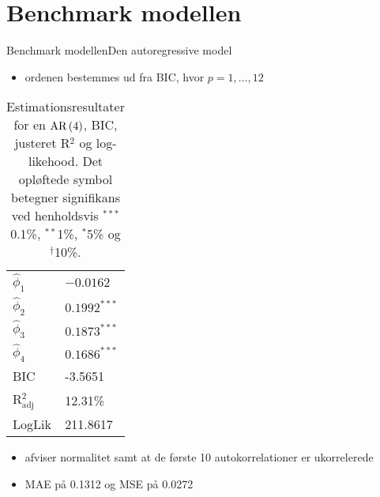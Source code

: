 \section{Benchmark modellen}
\begin{frame}{Benchmark modellen}{Den autoregressive model}
\begin{itemize}
\item ordenen bestemmes ud fra BIC, hvor \(p = 1,\ldots, 12\)
\end{itemize}
\begin{table}[h]
\center
\begin{tabular}{ll}
\toprule
$\widehat{\phi}_1$ &$ -0.0162 $ \\
$\widehat{\phi}_2$ & $0.1992^{***}$  \\
$\widehat{\phi}_3$ &$0.1873^{***}$  \\
$\widehat{\phi}_4$ &$0.1686^{***} $ \\ \midrule
BIC & -3.5651 \\
 R$^2_{\text{adj}}$ & 12.31\% \\
LogLik &  211.8617\\ \bottomrule
 \end{tabular}
\caption{Estimationsresultater for en \(\text{AR} \del{4}\), BIC, justeret R$^2$ og log-likehood. Det opløftede symbol betegner signifikans ved henholdsvis $^{***}$0.1\%, $^{**}$1\%, $^{*}$5\% og $^{\dagger}$10\%.} \label{tab:est_ar}
\end{table}
\begin{itemize}
\item afviser normalitet samt at de første 10 autokorrelationer er ukorrelerede
\item MAE på 0.1312 og MSE på 0.0272
\end{itemize}
\end{frame}


